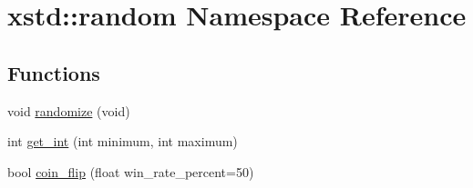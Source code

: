 \hypertarget{namespacexstd_1_1random}{\section{xstd\-:\-:random Namespace Reference}
\label{namespacexstd_1_1random}
}
\subsection*{Functions}
\begin{DoxyCompactItemize}
\item 
void \hyperlink{namespacexstd_1_1random_aebd951891ee8cc82c7a61482ad3dabc6}{randomize} (void)
\item 
int \hyperlink{namespacexstd_1_1random_a1572ab839ec96ad9a8452c859199230a}{get\-\_\-int} (int minimum, int maximum)
\item 
bool \hyperlink{namespacexstd_1_1random_ae59f15bad38afbe5db860719a262cd8c}{coin\-\_\-flip} (float win\-\_\-rate\-\_\-percent=50)
\end{DoxyCompactItemize}



